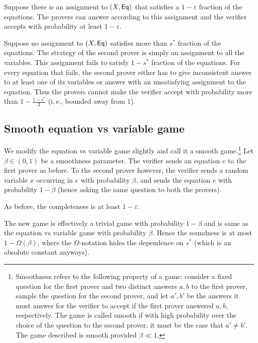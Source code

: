 \documentclass[11pt]{article}
\numberwithin{equation}{section}
\theoremstyle{definition}
\theoremstyle{plain}
\newcommand{\ie}{i.\,e.}
\newcommand\eps{\varepsilon}
\begin{document}
\smallskip
{} Suppose there is an assignment to $(X, {\sf Eq})$ that satisfies
a %
$1-\eps$ fraction of the equations.
The provers can answer according to this assignment and the verifier accepts with probability at least $1-\eps$.

\smallskip
{} Suppose no assignment to  $(X, {\sf Eq})$
satisfies more than $s^*$ fraction of the equations. The strategy of the second prover is simply an assignment to all the variables.
This assignment fails to satisfy $1-s^*$ fraction of the equations. For every equation that fails, the second prover either has to
give inconsistent answer to at least one of its variables or answer with an unsatisfying assignment to the equation. Thus the provers
cannot make the verifier accept with probability more than $1 - \frac{1-s^*}{3}$ (\ie, bounded away from $1$).



\subsection{Smooth equation vs variable game}

We modify the equation vs variable game slightly and call it a smooth game.\footnote{Smoothness refers to the following
property of a game: consider a fixed question for the first prover and two distinct answers $a,b$ to the first prover,
sample the question for the second prover, and let $a',b'$ be the answers it must answer for the verifier to accept if
the first prover answered $a,b$, respectively.  %
The game is called smooth if with high probability over the choice of the
question to the second prover, it must be the case that $a'\neq b'$. The game described is smooth provided $\beta \ll 1$. }
 Let $\beta \in (0,1)$ be a smoothness parameter.
The verifier sends an equation $e$ to the first prover as before. To the second prover however,
the verifier sends a random variable $x$ occurring in $e$ with probability $\beta$, and sends the equation $e$
with probability $1-\beta$ (hence asking the same question to both the provers).

\smallskip
{} As before, the completeness is at least $1-\eps$.

\smallskip
{} The new game is effectively a trivial game with probability $1- \beta$ and is same
as the equation vs variable game  with probability $\beta$. Hence the soundness is at most $1- \Omega\left(\beta\right)$,
where the $\Omega$-notation hides the dependence on $s^*$ (which is an absolute constant anyways).
\end{document}
